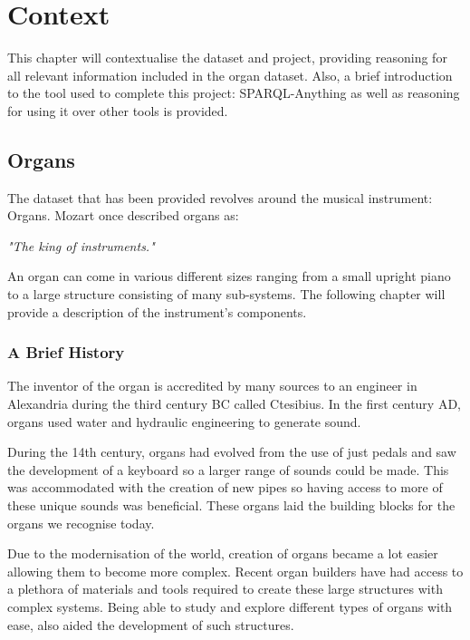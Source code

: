 \chapter{Context}
This chapter will contextualise the dataset and project, providing reasoning for all relevant information included in the organ dataset. Also, a brief introduction to the tool used to complete this project: SPARQL-Anything as well as reasoning for using it over other tools is provided. 

\section{Organs}
\hspace{0.5cm} The dataset that has been provided revolves around the musical instrument: Organs. Mozart once described organs as:

\vspace{-0.15cm}
\begin{displayquote}
    \textit{"The king of instruments."}
\end{displayquote}
\vspace{-0.15cm}

An organ can come in various different sizes ranging from a small upright piano to a large structure consisting of many sub-systems. The following chapter will provide a description of the instrument's components.

\subsection{A Brief History}
\hspace{0.5cm} 
The inventor of the organ is accredited by many sources to an engineer in Alexandria during the third century BC called Ctesibius. In the first century AD, organs used water and hydraulic engineering to generate sound. \cite{organhistory}

During the 14th century, organs had evolved from the use of just pedals and saw the development of a keyboard so a larger range of sounds could be made. This was accommodated with the creation of new pipes so having access to more of these unique sounds was beneficial. These organs laid the building blocks for the organs we recognise today. \cite{organmedivalhistory}

Due to the modernisation of the world, creation of organs became a lot easier allowing them to become more complex. Recent organ builders have had access to a plethora of materials and tools required to create these large structures with complex systems. Being able to study and explore different types of organs with ease, also aided the development of such structures.  \cite{organhistory1}

